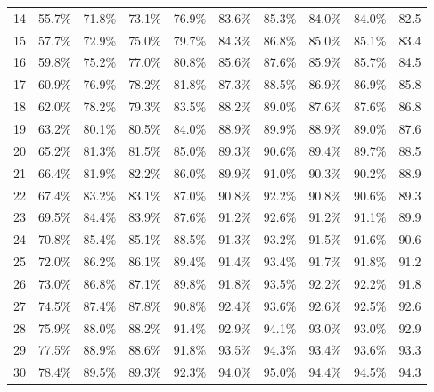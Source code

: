 \begin{table}[h]
\begin{center}
\begin{tabular}{c|p{1.2cm}p{1.1cm}p{1.1cm}p{1.7cm}p{1.5cm}p{1.2cm}p{1.2cm}p{1.2cm}p{1.2cm}}
	14 & 55.7\% & 71.8\% & 73.1\% & 76.9\% & 83.6\% & 85.3\% & 84.0\% & 84.0\% & 82.5 \\ 
	15 & 57.7\% & 72.9\% & 75.0\% & 79.7\% & 84.3\% & 86.8\% & 85.0\% & 85.1\% & 83.4 \\ 
	16 & 59.8\% & 75.2\% & 77.0\% & 80.8\% & 85.6\% & 87.6\% & 85.9\% & 85.7\% & 84.5 \\ 
	17 & 60.9\% & 76.9\% & 78.2\% & 81.8\% & 87.3\% & 88.5\% & 86.9\% & 86.9\% & 85.8 \\ 
	18 & 62.0\% & 78.2\% & 79.3\% & 83.5\% & 88.2\% & 89.0\% & 87.6\% & 87.6\% & 86.8 \\ 
	19 & 63.2\% & 80.1\% & 80.5\% & 84.0\% & 88.9\% & 89.9\% & 88.9\% & 89.0\% & 87.6 \\ 
	20 & 65.2\% & 81.3\% & 81.5\% & 85.0\% & 89.3\% & 90.6\% & 89.4\% & 89.7\% & 88.5 \\ 
	21 & 66.4\% & 81.9\% & 82.2\% & 86.0\% & 89.9\% & 91.0\% & 90.3\% & 90.2\% & 88.9 \\ 
	22 & 67.4\% & 83.2\% & 83.1\% & 87.0\% & 90.8\% & 92.2\% & 90.8\% & 90.6\% & 89.3 \\ 
	23 & 69.5\% & 84.4\% & 83.9\% & 87.6\% & 91.2\% & 92.6\% & 91.2\% & 91.1\% & 89.9 \\ 
	24 & 70.8\% & 85.4\% & 85.1\% & 88.5\% & 91.3\% & 93.2\% & 91.5\% & 91.6\% & 90.6 \\ 
	25 & 72.0\% & 86.2\% & 86.1\% & 89.4\% & 91.4\% & 93.4\% & 91.7\% & 91.8\% & 91.2 \\ 
	26 & 73.0\% & 86.8\% & 87.1\% & 89.8\% & 91.8\% & 93.5\% & 92.2\% & 92.2\% & 91.8 \\ 
	27 & 74.5\% & 87.4\% & 87.8\% & 90.8\% & 92.4\% & 93.6\% & 92.6\% & 92.5\% & 92.6 \\ 
	28 & 75.9\% & 88.0\% & 88.2\% & 91.4\% & 92.9\% & 94.1\% & 93.0\% & 93.0\% & 92.9 \\ 
	29 & 77.5\% & 88.9\% & 88.6\% & 91.8\% & 93.5\% & 94.3\% & 93.4\% & 93.6\% & 93.3 \\ 
	30 & 78.4\% & 89.5\% & 89.3\% & 92.3\% & 94.0\% & 95.0\% & 94.4\% & 94.5\% & 94.3 \\
	\hline\hline
    \end{tabular}
    \label{tab:media_eigen}
    \end{center}
\end{table}	

